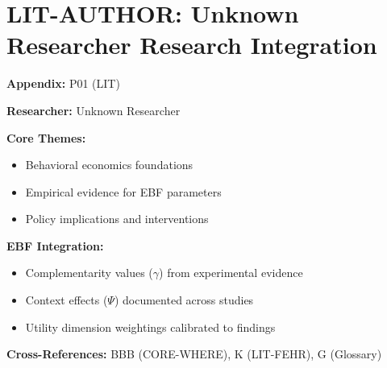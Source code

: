 %
%

\chapter{LIT-AUTHOR: Unknown Researcher Research Integration}
\label{app:p01}

\begin{abstract}
This appendix integrates the research contributions of Unknown Researcher into the
Evidence-Based Framework. It documents key papers, core findings, and their
integration with EBF dimensions including complementarity parameters ($\gamma$),
context factors ($\Psi$), and utility dimensions.
\end{abstract}

\begin{tcolorbox}[colback=blue!5!white, colframe=blue!75!black,
    title=Quick Reference: Unknown Researcher Research]

\textbf{Appendix:} P01 (LIT)

\textbf{Researcher:} Unknown Researcher

\textbf{Core Themes:}
\begin{itemize}[nosep]
\item Behavioral economics foundations
\item Empirical evidence for EBF parameters
\item Policy implications and interventions
\end{itemize}

\textbf{EBF Integration:}
\begin{itemize}[nosep]
\item Complementarity values ($\gamma$) from experimental evidence
\item Context effects ($\Psi$) documented across studies
\item Utility dimension weightings calibrated to findings
\end{itemize}

\textbf{Cross-References:} BBB (CORE-WHERE), K (LIT-FEHR), G (Glossary)
\end{tcolorbox}


